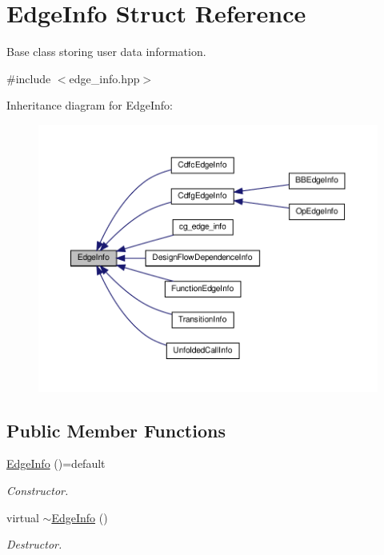 \hypertarget{structEdgeInfo}{}\section{Edge\+Info Struct Reference}
\label{structEdgeInfo}


Base class storing user data information.  




{\ttfamily \#include $<$edge\+\_\+info.\+hpp$>$}



Inheritance diagram for Edge\+Info\+:
\nopagebreak
\begin{figure}[H]
\begin{center}
\leavevmode
\includegraphics[width=350pt]{de/dc2/structEdgeInfo__inherit__graph}
\end{center}
\end{figure}
\subsection*{Public Member Functions}
\begin{DoxyCompactItemize}
\item 
\hyperlink{structEdgeInfo_a323c9099eb1dfd8d9679d546935b97c5}{Edge\+Info} ()=default
\begin{DoxyCompactList}\small\item\em Constructor. \end{DoxyCompactList}\item 
virtual \hyperlink{structEdgeInfo_a7266191cf036c114b90edc7dee9b2348}{$\sim$\+Edge\+Info} ()
\begin{DoxyCompactList}\small\item\em Destructor. \end{DoxyCompactList}\end{DoxyCompactItemize}


